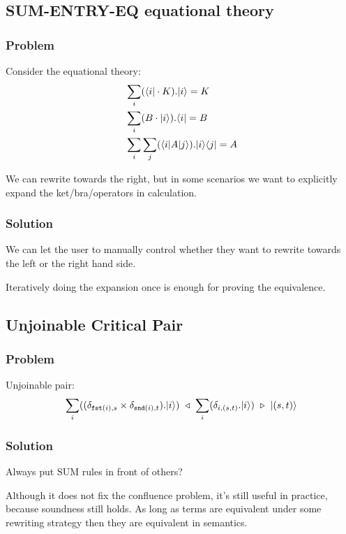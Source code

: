 \subsection{\textsf{SUM-ENTRY-EQ} equational theory}

\subsubsection*{Problem}
Consider the equational theory:
\begin{align*}
  & \sum_i (\langle i| \cdot K).|i\rangle = K \\
  & \sum_i (B \cdot |i\rangle).\langle i| = B \\
  & \sum_i \sum_j (\langle i| A |j\rangle).|i\rangle\langle j| = A
\end{align*}

We can rewrite towards the right, but in some scenarios we want to explicitly expand the ket/bra/operators in calculation.

\subsubsection*{Solution}
We can let the user to manually control whether they want to rewrite towards the left or the right hand side.

\begin{conjecture}
  Iteratively doing the expansion once is enough for proving the equivalence.
\end{conjecture}


\subsection{Unjoinable Critical Pair}
\subsubsection*{Problem}
Unjoinable pair:
$$
\sum_i ((\delta_{\texttt{fst}(i), s} \times \delta_{\texttt{snd}(i), t}).|i\rangle)\ \triangleleft\  \sum_i (\delta_{i, (s, t)} . |i\rangle) \ \triangleright\  |(s, t)\rangle
$$

\subsubsection*{Solution}
Always put \textsf{SUM} rules in front of others?

Although it does not fix the confluence problem, it's still useful in practice, because soundness still holds. As long as terms are equivalent under some rewriting strategy then they are equivalent in semantics.




